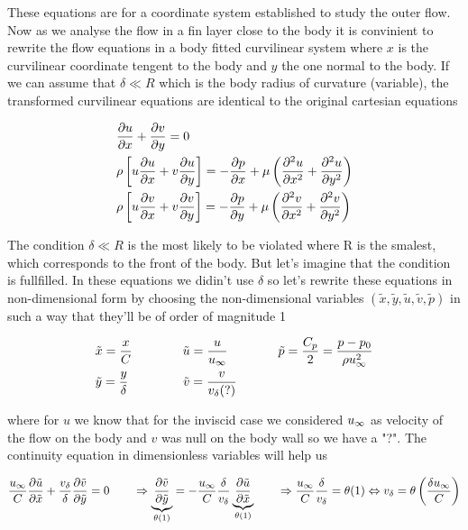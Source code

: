 	These equations are for a coordinate system established to study the outer flow. Now as we analyse the flow in a fin layer close to the body it is convinient to rewrite the flow equations in a body fitted curvilinear system where $x$ is the curvilinear coordinate tengent to the body and $y$ the one normal to the body. If we can assume that $\delta \ll R$ which is the body radius of curvature (variable), the transformed curvilinear equations are identical to the original cartesian equations
	
	\begin{equation}
		\begin{aligned}
		&\frac{\partial u}{\partial x} + \frac{\partial v}{\partial y} = 0\\
		&\rho \left[ u \frac{\partial u}{\partial x} + v \frac{\partial u}{\partial y} \right] = -\frac{\partial p}{\partial x} + \mu \left( \frac{\partial ^2 u}{\partial x^2} + \frac{\partial ^2 u}{\partial y^2} \right) \\
		&\rho \left[ u \frac{\partial v}{\partial x} + v \frac{\partial v}{\partial y} \right] = -\frac{\partial p}{\partial y} + \mu \left( \frac{\partial ^2 v}{\partial x^2} + \frac{\partial ^2 v}{\partial y^2} \right)
	\end{aligned}
	\end{equation}
	
	The condition $\delta \ll R$ is the most likely to be violated where R is the smalest, which corresponds to the front of the body. But let's imagine that the condition is fullfilled. In these equations we didin't use $\delta$ so let's rewrite these equations in non-dimensional form by choosing the non-dimensional variables $(\tilde{x}, \tilde{y}, \tilde{u}, \tilde{v}, \tilde{p})$ in such a way that they'll be of order of magnitude 1
	
	\begin{equation}
	\begin{aligned}
		&\tilde{x} = \frac{x}{C} \qquad\qquad  \tilde{u} = \frac{u}{u_\infty} \qquad\qquad  \tilde{p} = \frac{C_p}{2} = \frac{p-p_0}{\rho u_\infty ^2}\\
		&\tilde{y} = \frac{y}{\delta} \qquad \qquad \ \tilde{v} = \frac{v}{v_\delta (?)} 
	\end{aligned}
	\end{equation}
	
	where for $u$ we know that for the inviscid case we considered $u_\infty$ as velocity of the flow on the body and $v$ was null on the body wall so we have a "?". The continuity equation in dimensionless variables will help us 
	
	\begin{equation}
		\frac{u_\infty}{C}\frac{\partial \tilde{u}}{\partial \tilde{x}} + \frac{v_\delta}{\delta}\frac{\partial \tilde{v}}{\partial \tilde{y}} = 0 \qquad \Rightarrow \underbrace{\frac{\partial \tilde{v}}{\partial \tilde{y}}}_{\theta (1)} = - \frac{u_\infty}{C} \frac{\delta}{v_\delta} \underbrace{\frac{\partial \tilde{u}}{\partial \tilde{x}}}_{\theta (1)} \qquad \Rightarrow \frac{u_\infty}{C} \frac{\delta}{v_\delta} = \theta (1) \Leftrightarrow v_\delta = \theta \left( \frac{\delta u_\infty}{C}\right)
	\end{equation}	 
	
